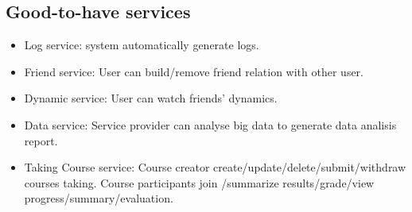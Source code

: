 \documentclass[runningheads]{llncs}
\begin{document}
\subsection*{Good-to-have services}
\begin{itemize}
    \item Log service: system automatically generate logs.
    \item Friend service: User can build/remove friend relation with other user.
    \item Dynamic service: User can watch friends' dynamics.
    \item Data service: Service provider can analyse big data to generate data analisis report.
    \item Taking Course service: Course creator create/update/delete/submit/withdraw courses taking. Course participants join /summarize results/grade/view progress/summary/evaluation.
\end{itemize}
\end{document}
